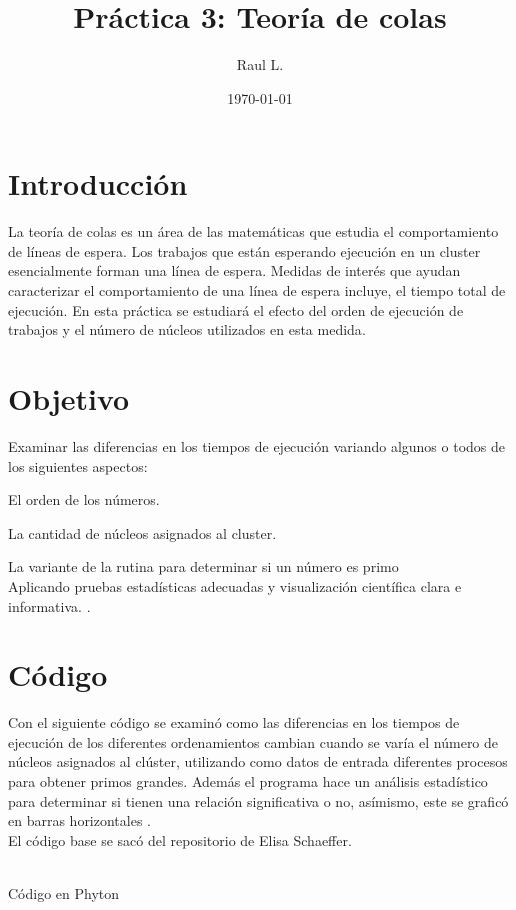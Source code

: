 \documentclass{article}
\author{Raul L.} %
\title{Pr\'{a}ctica 3:  Teoría de colas} %
\date{\today}
\begin{document}

\maketitle %


\section{Introducci\'{o}n}\label{intro} %



La teoría de colas es un área de las matemáticas que estudia el comportamiento de líneas de espera. Los trabajos que están esperando ejecución en un cluster esencialmente forman una línea de espera. Medidas de interés que ayudan caracterizar el comportamiento de una línea de espera incluye, el tiempo total de ejecución. En esta práctica se estudiará el efecto del orden de ejecución de trabajos y el número de núcleos utilizados en esta medida\citep{ejemplo}.

\section{Objetivo}
Examinar las diferencias en los tiempos de ejecución variando algunos o todos de los siguientes aspectos:

El orden de los números.

La cantidad de núcleos asignados al cluster.

La variante de la rutina para determinar si un número es primo\\
Aplicando pruebas estadísticas adecuadas y visualización científica clara e informativa.
\citep{ejemplo}.


\section{C\'{o}digo}
Con el siguiente código se examinó como las diferencias en los tiempos de ejecución de los diferentes ordenamientos cambian cuando se varía el número de núcleos asignados al clúster, utilizando como datos de entrada diferentes procesos para obtener primos grandes. Además el programa hace un análisis estadístico para determinar si tienen una relación significativa o no, asímismo, este se graficó en barras horizontales .\\
El c\'{o}digo base se sac\'{o} del repositorio de Elisa Schaeffer.

\\ Código en Phyton 
\end{document}
